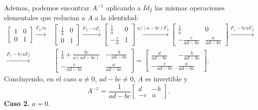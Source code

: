 \documentclass{article}
\theoremstyle{definition}
\theoremstyle{definition}
\theoremstyle{remark}
\begin{document}
   Ademas, podemos encontrar $A^{-1}$ aplicando a $Id_2$ las mismas operaciones elementales que reducian a $A$ a la identidad: \[
     \begin{aligned}
       \begin{bmatrix} 1 & 0 \\ 0 & 1 \end{bmatrix} \xrightarrow{F_1/a} &\begin{bmatrix} \frac{1}{a} & 0 \\ 0 & 1 \end{bmatrix} \xrightarrow {F_2-cF_1} \begin{bmatrix} \frac{1}{a} & 0 \\ 
       -\frac{c}{a} & 1 \end{bmatrix} \xrightarrow{a/(a-bc)F_2}\begin{bmatrix}\frac{1}{a} & 0 \\ -\frac{c}{ad-bc} & \frac{a}{ad-bc}\end{bmatrix} \xrightarrow{F_1-b/aF_2} \\
       \xrightarrow{F_1-b/aF_2} & \begin{bmatrix}  \frac{1}{a} + \frac{bc}{a(ad-bc)} & -\frac{b}{ad-bc} \\ -\frac{c}{ad-bc} & \frac{a}{ad-bc} \end{bmatrix} = \begin{bmatrix}\frac{d}{ad-bc} & -\frac{b}{ad-bc} \\ - \frac{c}{ad-bc} & \frac{a}{ad-bc} \end{bmatrix}.
   \end{aligned}
   \]
   Concluyendo, en el caso $a \neq 0$, $ad-bc\neq0$, $A$ es invertible y \begin{equation}
     A^{-1} = \frac{1}{ad-bc}\begin{bmatrix}d & -b \\ -c & a \end{bmatrix}.
   \end{equation}
   \textbf{Caso 2.} $a = 0$.\\\\
\end{document}
